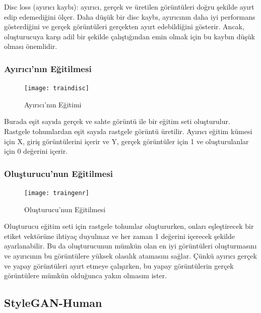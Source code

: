 \documentclass[12pt, a4paper]{article}
\begin{document}
	Disc loss (ayırıcı kaybı): ayırıcı, gerçek ve üretilen görüntüleri doğru şekilde ayırt edip edemediğini ölçer. Daha düşük bir disc kaybı, ayırıcının daha iyi performans gösterdiğini ve gerçek görüntüleri gerçekten ayırt edebildiğini gösterir. Ancak, oluşturucuya karşı adil bir şekilde çalıştığından emin olmak için bu kaybın düşük olması önemlidir\cite{ChatGPT-2024-05-29}.
	
	
	\subsubsection{Ayırıcı'nın Eğitilmesi}
	\begin{figure}[h]
		\centering
		\texttt{[image: traindisc]}
		\label{genrdisc}
		\caption{Ayırıcı'nın Eğitimi\cite{present/youtube/gan/gans_scratch.ipynb-2024-05-01}}
	\end{figure}
	\FloatBarrier
	Burada eşit sayıda gerçek ve sahte görüntü ile bir eğitim seti oluşturulur. Rastgele tohumlardan eşit sayıda rastgele görüntü üretilir. Ayırıcı eğitim kümesi için X, giriş görüntülerini içerir ve Y, gerçek görüntüler için 1 ve oluşturulanlar için 0 değerini içerir.

	\subsubsection{Oluşturucu'nun Eğitilmesi}
	\begin{figure}[h]
		\centering
		\texttt{[image: traingenr]}
		\label{genrdisc}
		\caption{Oluşturucu'nun Eğitilmesi\cite{present/youtube/gan/gans_scratch.ipynb-2024-05-01}}
	\end{figure}
	\FloatBarrier
	Oluşturucu eğitim seti için rastgele tohumlar oluştururken, onları eşleştirecek bir etiket vektörüne ihtiyaç duyulmaz ve her zaman 1 değerini içerecek şekilde ayarlanabilir. Bu da oluşturucunun mümkün olan en iyi görüntüleri oluşturmasını ve ayırıcının bu görüntülere yüksek olasılık atamasını sağlar. Çünkü ayırıcı gerçek ve yapay görüntüleri ayırt etmeye çalışırken, bu yapay görüntülerin gerçek görüntülere mümkün olduğunca yakın olmasını ister.
	
	\subsection{StyleGAN-Human}
	
\end{document}
